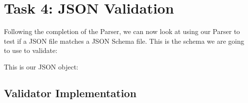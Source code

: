 \documentclass[a4paper]{article}
\begin{document}
\newpage


\section{Task 4: JSON Validation}

Following the completion of the Parser, we can now look at using our Parser to test if a JSON file matches a JSON Schema file.
This is the schema we are going to use to validate:


\noindent This is our JSON object:




\newpage
\subsection*{Validator Implementation}


\end{document}
